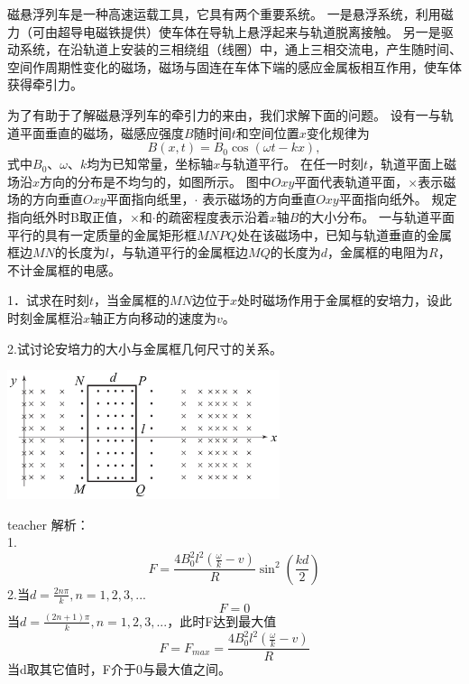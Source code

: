 \begin{example}
磁悬浮列车是一种高速运载工具，它具有两个重要系统。
一是悬浮系统，利用磁力（可由超导电磁铁提供）使车体在导轨上悬浮起来与轨道脱离接触。
另一是驱动系统，在沿轨道上安装的三相绕组（线圈）中，通上三相交流电，产生随时间、空间作周期性变化的磁场，磁场与固连在车体下端的感应金属板相互作用，使车体获得牵引力。

为了有助于了解磁悬浮列车的牵引力的来由，我们求解下面的问题。
设有一与轨道平面垂直的磁场，磁感应强度$B$随时间$t$和空间位置$x$变化规律为
\[B(x,t) = B_0\cos(\omega t-kx),\]  
式中$B_0、\omega 、 k$均为已知常量，坐标轴$x$与轨道平行。
在任一时刻$t$，轨道平面上磁场沿$x$方向的分布是不均匀的，如图所示。
图中$Oxy$平面代表轨道平面，×表示磁场的方向垂直$Oxy$平面指向纸里，$\cdot$ 表示磁场的方向垂直$Oxy$平面指向纸外。
规定指向纸外时B取正值，×和$\cdot$的疏密程度表示沿着$x$轴$B$的大小分布。
一与轨道平面平行的具有一定质量的金属矩形框$MNPQ$处在该磁场中，已知与轨道垂直的金属框边$MN$的长度为$l$，与轨道平行的金属框边$MQ$的长度为$d$，金属框的电阻为$R$，不计金属框的电感。

1．试求在时刻$t$，当金属框的$MN$边位于$x$处时磁场作用于金属框的安培力，设此时刻金属框沿$x$轴正方向移动的速度为$v$。 

 2.试讨论安培力的大小与金属框几何尺寸的关系。 
 \begin{flushright}
 \includegraphics[width = 0.6\textwidth]{images/mag-40.pdf} 
 \end{flushright}

\begin{taggedblock}{teacher}
\noindent
解析：
\\1.\[F=\frac{4B_0^2l^2(\frac{\omega}{k}-v)}{R}\sin^2(\frac{kd}{2})\]
2.当$d=\frac{2n\pi}{k},n=1,2,3,...$
\[F=0\]
当$d=\frac{(2n+1)\pi}{k},n=1,2,3,...$，此时F达到最大值
\[F=F_{max}=\frac{4B_0^2l^2(\frac{\omega}{k}-v)}{R}\]
当d取其它值时，F介于0与最大值之间。
\end{taggedblock}
\end{example}

